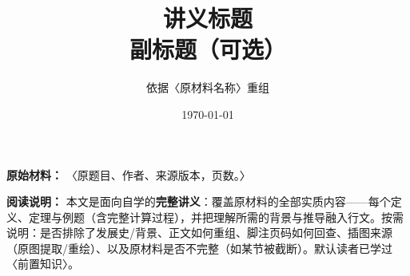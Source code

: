 \documentclass[UTF8,a4paper,11pt,fontset=fandol]{ctexart}
\title{讲义标题\\[2pt]\large 副标题（可选）}
\author{依据〈原材料名称〉重组}
\date{\today}
\begin{document}
\maketitle

\noindent\textbf{原始材料：}
〈原题目、作者、来源版本，页数。〉

\medskip
\noindent\textbf{阅读说明：}
本文是面向自学的\textbf{完整讲义}：覆盖原材料的全部实质内容——每个定义、定理与例题（含完整计算过程），并把理解所需的背景与推导融入行文。按需说明：是否排除了发展史/背景、正文如何重组、脚注页码如何回查、插图来源（原图提取/重绘）、以及原材料是否不完整（如某节被截断）。默认读者已学过〈前置知识〉。

\tableofcontents

% 
% 
\end{document}
